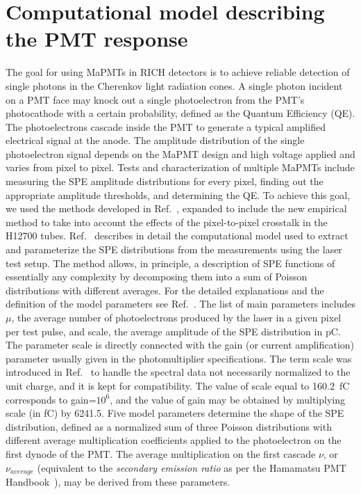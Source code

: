 \section{Computational model describing the PMT response}

The goal for using MaPMTs in RICH detectors is to achieve reliable detection of single photons in the Cherenkov light radiation cones. A single photon incident on a PMT face may knock out a single photoelectron from the PMT's photocathode with a certain probability, defined as the Quantum Efficiency (QE). The photoelectrons cascade inside the PMT to generate a typical amplified electrical signal at the anode. The amplitude distribution of the single photoelectron signal depends on the MaPMT design and high voltage applied and varies from pixel to pixel. Tests and characterization of multiple MaPMTs include measuring the SPE amplitude distributions for every pixel, finding out the appropriate amplitude thresholds, and determining the QE. To achieve this goal, we used the methods developed in Ref.~\cite{DEGTIARENKO20171}, expanded to include the new empirical method to take into account the effects of the pixel-to-pixel crosstalk in the H12700 tubes. Ref.~\cite{DEGTIARENKO20171} describes in detail the computational model used to extract and parameterize the SPE distributions from the measurements using the laser test setup. The method allows, in principle, a description of SPE functions of essentially any complexity by decomposing them into a sum of Poisson distributions with different averages. For the detailed explanations and the definition of the model parameters see Ref.~\cite{DEGTIARENKO20171}. The list of main parameters includes $\mu$, the average number of photoelectrons produced by the laser in a given pixel per test pulse, and scale, the average amplitude of the SPE distribution in pC. 
The parameter scale is directly connected with the gain (or current amplification) parameter usually given in the photomultiplier specifications. The term scale was introduced in Ref.~\cite{DEGTIARENKO20171} to handle the spectral data not necessarily normalized to the unit charge, and it is kept for compatibility. The value of scale equal to 160.2~fC corresponds to gain=$10^6$, and the value of gain may be obtained by multiplying scale (in fC) by 6241.5.
Five model parameters determine the shape of the SPE distribution, defined as a normalized sum of three Poisson distributions with different average multiplication coefficients  applied to the photoelectron on the first dynode of the PMT. The average multiplication on the first cascade ${\nu}$, or ${\nu_{average}}$ (equivalent to the {\it secondary emission ratio} as per the Hamamatsu PMT Handbook~\cite{Hamamatsu4thedition}), may be derived from these parameters. 
